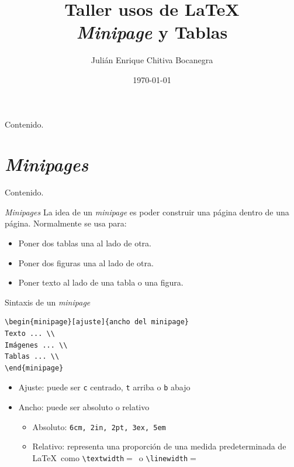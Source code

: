 \documentclass[dvipsnames,xcolor, handout]{beamer}
\title{Taller usos de \LaTeX \\ \small{\textit{Minipage} y Tablas} \vspace*{-0.2cm}}
\author[Julián Chitiva Bocanegra]{Julián Enrique Chitiva Bocanegra}
\institute[Uniandes] 
{Universidad de los Andes\\ Facultad de Economía}
\date{\today}
\theoremstyle{plain}
\theoremstyle{definition}
\begin{document}
\begin{frame}
  \titlepage
\end{frame}

\begin{frame}{Contenido.}
\begin{multicols}{2}
  \tableofcontents
\end{multicols}
\end{frame}

\section{\itshape Minipages}
\begin{frame}{Contenido.}
\begin{multicols}{2}
  \tableofcontents[currentsection]
\end{multicols}
\end{frame}

\begin{frame}[fragile]{\protect\textit{Minipages}}
La idea de un \textit{minipage} es poder construir una página dentro de una página. Normalmente se usa para:
\begin{itemize}
    \item Poner dos tablas una al lado de otra.
    \item Poner dos figuras una al lado de otra.
    \item Poner texto al lado de una tabla o una figura.
\end{itemize}
\end{frame}

\begin{frame}[fragile]{Sintaxis de un \protect\textit{minipage}}
\begin{verbatim}
\begin{minipage}[ajuste]{ancho del minipage}
Texto ... \\
Imágenes ... \\
Tablas ... \\
\end{minipage} 
\end{verbatim}
\begin{itemize}
    \item Ajuste: puede ser \verb!c! centrado, \verb!t! arriba o \verb!b! abajo 
    \item Ancho: puede ser absoluto o relativo
    \begin{itemize}
        \item Absoluto: \verb!6cm, 2in, 2pt, 3ex, 5em!
        \item Relativo: representa una proporción de una medida predeterminada de \LaTeX\ como \verb!\textwidth!$=$\the\textwidth\  o \verb!\linewidth!$=$\the\linewidth
    \end{itemize}
\end{itemize}
\end{frame}
\end{document}
